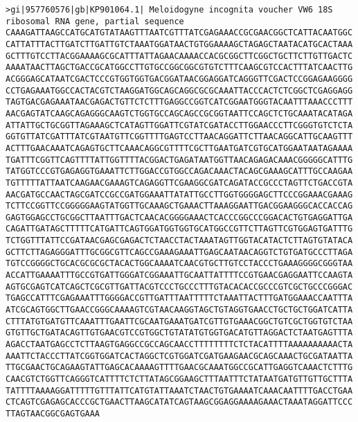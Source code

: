 \documentclass[11pt]{article}
\begin{document}
\begin{Verbatim}[commandchars=\\\{\}]
>gi|957760576|gb|KP901064.1| Meloidogyne incognita voucher VW6 18S ribosomal RNA gene, partial sequence
CAAAGATTAAGCCATGCATGTATAAGTTTAATCGTTTATCGAGAAACCGCGAACGGCTCATTACAATGGC
CATTATTTACTTGATCTTGATTGTCTAAATGGATAACTGTGGAAAAGCTAGAGCTAATACATGCACTAAA
GCTTTGTCCTTACGGAAAAGCGCATTTATTAGAACAAAACCACGCGGCTTCGGCTGCTTCTTGTTGACTC
AAAATAACTTAGCTGACCGCATGGCCTTGTGCCGGCGGCGTGTCTTTCAAGCGTCCACTTTATCAACTTG
ACGGGAGCATAATCGACTCCCGTGGTGGTGACGGATAACGGAGGATCAGGGTTCGACTCCGGAGAAGGGG
CCTGAGAAATGGCCACTACGTCTAAGGATGGCAGCAGGCGCGCAAATTACCCACTCTCGGCTCGAGGAGG
TAGTGACGAGAAATAACGAGACTGTTCTCTTTGAGGCCGGTCATCGGAATGGGTACAATTTAAACCCTTT
AACGAGTATCAAGCAGAGGGCAAGTCTGGTGCCAGCAGCCGCGGTAATTCCAGCTCTGCAAATACATAGA
ATTATTGCTGCGGTTAGAAAGCTCATAGTTGGATTCGTATCGATACCTTGGAACCCTTCGGGTGTCTCTA
GGTGTTATCGATTTATCGTAATGTTCGGTTTTGAGTCCTTAACAGGATTCTTAACAGGCATTGCAAGTTT
ACTTTGAACAAATCAGAGTGCTTCAAACAGGCGTTTTCGCTTGAATGATCGTGCATGGAATAATAGAAAA
TGATTTCGGTTCAGTTTTATTGGTTTTACGGACTGAGATAATGGTTAACAGAGACAAACGGGGGCATTTG
TATGGTCCCGTGAGAGGTGAAATTCTTGGACCGTGGCCAGACAAACTACAGCGAAAGCATTTGCCAAGAA
TGTTTTTATTAATCAAGAACGAAAGTCAGAGGTTCGAAGGCGATCAGATACCGCCCTAGTTCTGACCGTA
AACGATGCCAACTAGCGATCCGCCGATGGAAATTATATTGCCTTGGTGGGGAGCTTCCCGGAAACGAAAG
TCTTCCGGTTCCGGGGGAAGTATGGTTGCAAAGCTGAAACTTAAAGGAATTGACGGAAGGGCACCACCAG
GAGTGGAGCCTGCGGCTTAATTTGACTCAACACGGGGAAACTCACCCGGCCCGGACACTGTGAGGATTGA
CAGATTGATAGCTTTTTCATGATTCAGTGGATGGTGGTGCATGGCCGTTCTTAGTTCGTGGAGTGATTTG
TCTGGTTTATTCCGATAACGAGCGAGACTCTAACCTACTAAATAGTTGGTACATACTCTTAGTGTATACA
GCTTCTTAGAGGGATTTGCGGCGTTCAGCCGAAAGAAATTGAGCAATAACAGGTCTGTGATGCCCTTAGA
TGTCCGGGGCTGCACGCGCGCTACACTGGCAAAATCAACGTGCTTGTCCTACCCTGAAAGGGGCGGGTAA
ACCATTGAAAATTTGCCGTGATTGGGATCGGAAATTGCAATTATTTTCCGTGAACGAGGAATTCCAAGTA
AGTGCGAGTCATCAGCTCGCGTTGATTACGTCCCTGCCCTTTGTACACACCGCCCGTCGCTGCCCGGGAC
TGAGCCATTTCGAGAAATTTGGGGACCGTTGATTTAATTTTTCTAAATTACTTTGATGGAAACCAATTTA
ATCGCAGTGGCTTGAACCGGGCAAAAGTCGTAACAAGGTAGCTGTAGGTGAACCTGCTGCTGGATCATTA
CTTTATGTGATGTTCAAATTTGAATTCGCAATGAAATGATCGTTGTGAAACGGCTGTCGCTGGTGTCTAA
GTGTTGCTGATACAGTTGTGAACGTCCGTGGCTGTATATGTGGTGACATGTTAGGACTCTAATGAGTTTA
AGACCTAATGAGCCTCTTAAGTGAGGCCGCCAGCAACCTTTTTTTTCTCTACATTTTAAAAAAAAAACTA
AAATTCTACCCTTATCGGTGGATCACTAGGCTCGTGGATCGATGAAGAACGCAGCAAACTGCGATAATTA
TTGCGAACTGCAGAAGTATTGAGCACAAAAGTTTTGAACGCAAATGGCCGCATTGAGGTCAAACTCTTTG
CAACGTCTGGTTCAGGGTCATTTTCTCTTATAGCGGAAGCTTTAATTTCTATAATGATGTTGTTGCTTTA
TATTTTAAAAGGATTTTTGTTTATTCATGTATTAAATCTAACTGTGAAAATCAAACAATTTTGACCTGAA
CTCAGTCGAGAGCACCCGCTGAACTTAAGCATATCAGTAAGCGGAGGAAAAGAAACTAAATAGGATTCCC
TTAGTAACGGCGAGTGAAA


\end{Verbatim}
\end{document}
